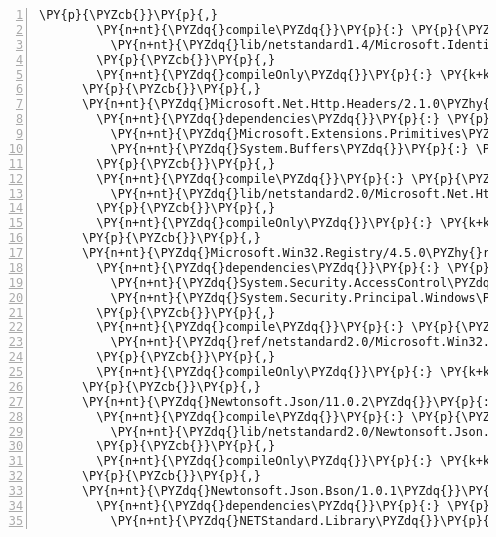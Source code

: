 \begin{Verbatim}[commandchars=\\\{\},numbers=left,firstnumber=1,stepnumber=1,numberblanklines=0]
        \PY{p}{\PYZcb{}}\PY{p}{,}
        \PY{n+nt}{\PYZdq{}compile\PYZdq{}}\PY{p}{:} \PY{p}{\PYZob{}}
          \PY{n+nt}{\PYZdq{}lib/netstandard1.4/Microsoft.IdentityModel.Xml.dll\PYZdq{}}\PY{p}{:} \PY{p}{\PYZob{}}\PY{p}{\PYZcb{}}
        \PY{p}{\PYZcb{}}\PY{p}{,}
        \PY{n+nt}{\PYZdq{}compileOnly\PYZdq{}}\PY{p}{:} \PY{k+kc}{true}
      \PY{p}{\PYZcb{}}\PY{p}{,}
      \PY{n+nt}{\PYZdq{}Microsoft.Net.Http.Headers/2.1.0\PYZhy{}rc1\PYZhy{}final\PYZdq{}}\PY{p}{:} \PY{p}{\PYZob{}}
        \PY{n+nt}{\PYZdq{}dependencies\PYZdq{}}\PY{p}{:} \PY{p}{\PYZob{}}
          \PY{n+nt}{\PYZdq{}Microsoft.Extensions.Primitives\PYZdq{}}\PY{p}{:} \PY{l+s+s2}{\PYZdq{}2.1.0\PYZhy{}rc1\PYZhy{}final\PYZdq{}}\PY{p}{,}
          \PY{n+nt}{\PYZdq{}System.Buffers\PYZdq{}}\PY{p}{:} \PY{l+s+s2}{\PYZdq{}4.5.0\PYZhy{}rc1\PYZdq{}}
        \PY{p}{\PYZcb{}}\PY{p}{,}
        \PY{n+nt}{\PYZdq{}compile\PYZdq{}}\PY{p}{:} \PY{p}{\PYZob{}}
          \PY{n+nt}{\PYZdq{}lib/netstandard2.0/Microsoft.Net.Http.Headers.dll\PYZdq{}}\PY{p}{:} \PY{p}{\PYZob{}}\PY{p}{\PYZcb{}}
        \PY{p}{\PYZcb{}}\PY{p}{,}
        \PY{n+nt}{\PYZdq{}compileOnly\PYZdq{}}\PY{p}{:} \PY{k+kc}{true}
      \PY{p}{\PYZcb{}}\PY{p}{,}
      \PY{n+nt}{\PYZdq{}Microsoft.Win32.Registry/4.5.0\PYZhy{}rc1\PYZdq{}}\PY{p}{:} \PY{p}{\PYZob{}}
        \PY{n+nt}{\PYZdq{}dependencies\PYZdq{}}\PY{p}{:} \PY{p}{\PYZob{}}
          \PY{n+nt}{\PYZdq{}System.Security.AccessControl\PYZdq{}}\PY{p}{:} \PY{l+s+s2}{\PYZdq{}4.5.0\PYZhy{}rc1\PYZdq{}}\PY{p}{,}
          \PY{n+nt}{\PYZdq{}System.Security.Principal.Windows\PYZdq{}}\PY{p}{:} \PY{l+s+s2}{\PYZdq{}4.5.0\PYZhy{}rc1\PYZdq{}}
        \PY{p}{\PYZcb{}}\PY{p}{,}
        \PY{n+nt}{\PYZdq{}compile\PYZdq{}}\PY{p}{:} \PY{p}{\PYZob{}}
          \PY{n+nt}{\PYZdq{}ref/netstandard2.0/Microsoft.Win32.Registry.dll\PYZdq{}}\PY{p}{:} \PY{p}{\PYZob{}}\PY{p}{\PYZcb{}}
        \PY{p}{\PYZcb{}}\PY{p}{,}
        \PY{n+nt}{\PYZdq{}compileOnly\PYZdq{}}\PY{p}{:} \PY{k+kc}{true}
      \PY{p}{\PYZcb{}}\PY{p}{,}
      \PY{n+nt}{\PYZdq{}Newtonsoft.Json/11.0.2\PYZdq{}}\PY{p}{:} \PY{p}{\PYZob{}}
        \PY{n+nt}{\PYZdq{}compile\PYZdq{}}\PY{p}{:} \PY{p}{\PYZob{}}
          \PY{n+nt}{\PYZdq{}lib/netstandard2.0/Newtonsoft.Json.dll\PYZdq{}}\PY{p}{:} \PY{p}{\PYZob{}}\PY{p}{\PYZcb{}}
        \PY{p}{\PYZcb{}}\PY{p}{,}
        \PY{n+nt}{\PYZdq{}compileOnly\PYZdq{}}\PY{p}{:} \PY{k+kc}{true}
      \PY{p}{\PYZcb{}}\PY{p}{,}
      \PY{n+nt}{\PYZdq{}Newtonsoft.Json.Bson/1.0.1\PYZdq{}}\PY{p}{:} \PY{p}{\PYZob{}}
        \PY{n+nt}{\PYZdq{}dependencies\PYZdq{}}\PY{p}{:} \PY{p}{\PYZob{}}
          \PY{n+nt}{\PYZdq{}NETStandard.Library\PYZdq{}}\PY{p}{:} \PY{l+s+s2}{\PYZdq{}2.0.3\PYZdq{}}\PY{p}{,}

\end{Verbatim}
